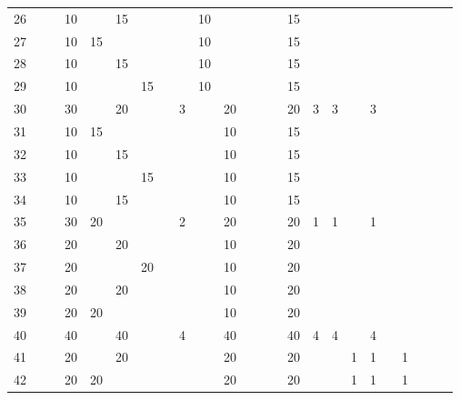 \begin{table}[t]
\begin{center}
\begin{tabular}{r|g c g c g c g c g c g c g c g c g c g c g c g}
   26 &    &    & 10 &    & 15 &    &    &   & 10 &    &    &    &    & 15 &   &   &    &   &   &   &   &   &   \\
   27 &    &    & 10 & 15 &    &    &    &   & 10 &    &    &    &    & 15 &   &   &    &   &   &   &   &   &   \\
   28 &    &    & 10 &    & 15 &    &    &   & 10 &    &    &    &    & 15 &   &   &    &   &   &   &   &   &   \\
   29 &    &    & 10 &    &    & 15 &    &   & 10 &    &    &    &    & 15 &   &   &    &   &   &   &   &   &   \\
   30 &    &    & 30 &    & 20 &    &    & 3 &    & 20 &    &    &    & 20 & 3 & 3 &    & 3 &   &   &   &   &   \\
   31 &    &    & 10 & 15 &    &    &    &   &    & 10 &    &    &    & 15 &   &   &    &   &   &   &   &   &   \\
   32 &    &    & 10 &    & 15 &    &    &   &    & 10 &    &    &    & 15 &   &   &    &   &   &   &   &   &   \\
   33 &    &    & 10 &    &    & 15 &    &   &    & 10 &    &    &    & 15 &   &   &    &   &   &   &   &   &   \\
   34 &    &    & 10 &    & 15 &    &    &   &    & 10 &    &    &    & 15 &   &   &    &   &   &   &   &   &   \\
   35 &    &    & 30 & 20 &    &    &    & 2 &    & 20 &    &    &    & 20 & 1 & 1 &    & 1 &   &   &   &   &   \\
   36 &    &    & 20 &    & 20 &    &    &   &    & 10 &    &    &    & 20 &   &   &    &   &   &   &   &   &   \\
   37 &    &    & 20 &    &    & 20 &    &   &    & 10 &    &    &    & 20 &   &   &    &   &   &   &   &   &   \\
   38 &    &    & 20 &    & 20 &    &    &   &    & 10 &    &    &    & 20 &   &   &    &   &   &   &   &   &   \\
   39 &    &    & 20 & 20 &    &    &    &   &    & 10 &    &    &    & 20 &   &   &    &   &   &   &   &   &   \\
   40 &    &    & 40 &    & 40 &    &    & 4 &    & 40 &    &    &    & 40 & 4 & 4 &    & 4 &   &   &   &   &   \\
   41 &    &    & 20 &    & 20 &    &    &   &    & 20 &    &    &    & 20 &   &   & 1  & 1 &   & 1 &   &   &   \\
   42 &    &    & 20 & 20 &    &    &    &   &    & 20 &    &    &    & 20 &   &   & 1  & 1 &   & 1 &   &   &   \\

\end{tabular}
\end{center}
\end{table}
